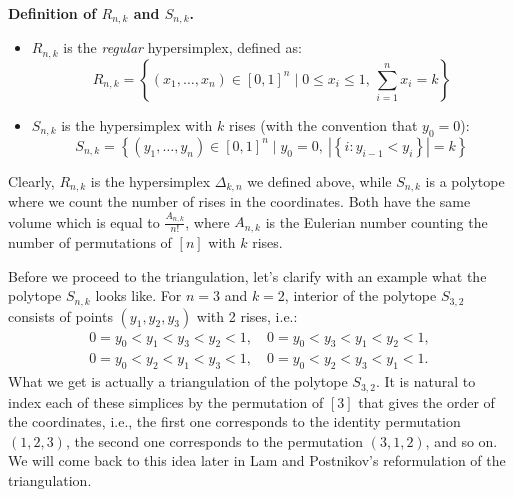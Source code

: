 \documentclass[12pt]{article}
\theoremstyle{definition}
\numberwithin{equation}{subsection}
\begin{document}
\textbf{Definition of $R_{n,k}$ and $S_{n,k}$.}
\begin{itemize}
    \item $R_{n,k}$ is the \textit{regular} hypersimplex, defined as:
    \[
    R_{n,k} = \left\{ (x_1, \ldots, x_n) \in [0,1]^n \mid 0 \leq x_i \leq 1,\, \sum_{i=1}^n x_i = k \right\}
    \]
    \item $S_{n,k}$ is the hypersimplex with $k$ rises (with the convention that $y_0 = 0$):
    \[
    S_{n,k} = \left\{ (y_1, \ldots, y_n) \in [0,1]^n \mid y_0 = 0,\ \left|\left\{ i : y_{i-1} < y_i \right\}\right| = k \right\}
    \]
\end{itemize}

Clearly, $R_{n,k}$ is the hypersimplex $\Delta_{k,n}$ we defined above, while $S_{n,k}$ is a polytope where we count the number of rises in the coordinates. Both have the same volume which is equal to $\frac{A_{n,k}}{n!}$, where $A_{n,k}$ is the Eulerian number counting the number of permutations of $[n]$ with $k$ rises.

Before we proceed to the triangulation, let's clarify with an example what the polytope $S_{n,k}$ looks like. For $n=3$ and $k=2$, interior of the polytope $S_{3,2}$ consists of points $(y_1, y_2, y_3)$ with 2 rises, i.e.:
\[
\begin{array}{l}
0 = y_0 < y_1 < y_3 < y_2 < 1,\quad 0 = y_0 < y_3 < y_1 < y_2 < 1, \\
0 = y_0 < y_2 < y_1 < y_3 < 1,\quad 0 = y_0 < y_2 < y_3 < y_1 < 1.
\end{array}
\]
What we get is actually a triangulation of the polytope $S_{3,2}$. It is natural to index each of these simplices by the permutation of $[3]$ that gives the order of the coordinates, i.e., the first one corresponds to the identity permutation $(1,2,3)$, the second one corresponds to the permutation $(3,1,2)$, and so on. We will come back to this idea later in Lam and Postnikov's reformulation of the triangulation.
\end{document}
